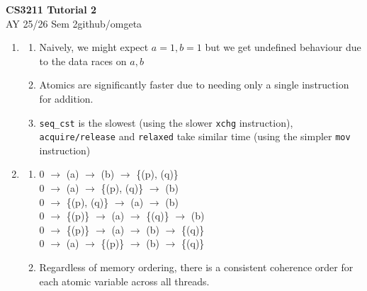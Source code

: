 \documentclass[12pt, a4paper]{article}
\newcommand{\mytitle}{CS3211 Tutorial 2}
\newcommand{\myauthor}{github/omgeta}
\newcommand{\mydate}{AY 25/26 Sem 2}
\begin{document}
\raggedright
\footnotesize
\begin{center}
{\normalsize{\textbf{\mytitle}}} \\
{\footnotesize{\mydate\hspace{2pt}\textemdash\hspace{2pt}\myauthor}}
\end{center}
\begin{enumerate}[Q\arabic*.]
  \item 
    \begin{enumerate}
      \item Naively, we might expect $a=1, b=1$ but we get undefined behaviour due to the data races on $a,b$

      \item Atomics are significantly faster due to needing only a single instruction for addition. 

      \item \lstinline|seq_cst| is the slowest (using the slower \lstinline|xchg| instruction), \lstinline|acquire/release| and \lstinline|relaxed| take similar time (using the simpler \lstinline|mov| instruction)
    \end{enumerate}

  \item 
    \begin{enumerate}
      \item 0 $\rightarrow$ (a) $\rightarrow$ (b) $\rightarrow$ \{(p), (q)\}\\
        0 $\rightarrow$ (a) $\rightarrow$ \{(p), (q)\} $\rightarrow$ (b)\\
        0 $\rightarrow$ \{(p), (q)\} $\rightarrow$ (a) $\rightarrow$ (b)\\
        0 $\rightarrow$ \{(p)\} $\rightarrow$ (a) $\rightarrow$ \{(q)\} $\rightarrow$ (b)\\
        0 $\rightarrow$ \{(p)\} $\rightarrow$ (a) $\rightarrow$ (b) $\rightarrow$ \{(q)\}\\
        0 $\rightarrow$ (a) $\rightarrow$ \{(p)\} $\rightarrow$ (b) $\rightarrow$ \{(q)\}

      \item Regardless of memory ordering, there is a consistent coherence order for each atomic variable across all threads.
    \end{enumerate}


\end{enumerate}
\end{document}
